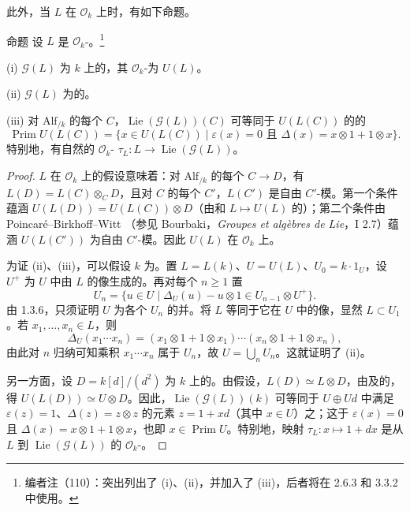 此外，当 $L$ 在 $\mathscr O_k$ 上时，有如下命题。
\begin{SGAresult}{命题}{}
设 $L$ 是 $\mathscr O_k$-。\footnote{编者注（110）：突出列出了 (i)、(ii)，并加入了 (iii)，后者将在 2.6.3 和 3.3.2 中使用。}

(i) $\mathscr G(L)$ 为 $k$ 上的，其 $\mathscr O_k$-为 $U(L)$。

(ii) $\mathscr G(L)$ 为的。

(iii) 对 $\mathrm{Alf}_{/k}$ 的每个 $C$，$\operatorname{Lie}(\mathscr G(L))(C)$ 可等同于 $U(L(C))$ 的的
\[
\operatorname{Prim}U(L(C))=\{x\in U(L(C))\mid\varepsilon(x)=0\text{ 且 }\Delta(x)=x\otimes1+1\otimes x\}.
\]
特别地，有自然的 $\mathscr O_k$- $\tau_L:L\to\operatorname{Lie}(\mathscr G(L))$。
\end{SGAresult}
\begin{proof}
$L$ 在 $\mathscr O_k$ 上的假设意味着：对 $\mathrm{Alf}_{/k}$ 的每个 $C\to D$，有 $L(D)=L(C)\otimes_C D$，且对 $C$ 的每个 $C'$，$L(C')$ 是自由 $C'$-模。第一个条件蕴涵 $U(L(D))=U(L(C))\otimes D$（由和 $L\mapsto U(L)$ 的）；第二个条件由 Poincaré--Birkhoff--Witt （参见 Bourbaki，\textit{Groupes et algèbres de Lie}，I 2.7）蕴涵 $U(L(C'))$ 为自由 $C'$-模。因此 $U(L)$ 在 $\mathscr O_k$ 上。

为证 (ii)、(iii)，可以假设 $k$ 为。置 $L=L(k)$、$U=U(L)$、$U_0=k\cdot1_U$，设 $U^+$ 为 $U$ 中由 $L$ 的像生成的。再对每个 $n\geq1$ 置
\[
U_n=\{u\in U\mid\Delta_U(u)-u\otimes1\in U_{n-1}\otimes U^+\}.
\]
由 1.3.6，只须证明 $U$ 为各个 $U_n$ 的并。将 $L$ 等同于它在 $U$ 中的像，显然 $L\subset U_1$。若 $x_1,\ldots,x_n\in L$，则
\[
\Delta_U(x_1\cdots x_n)=(x_1\otimes1+1\otimes x_1)\cdots(x_n\otimes1+1\otimes x_n),
\]
由此对 $n$ 归纳可知乘积 $x_1\cdots x_n$ 属于 $U_n$，故 $U=\bigcup_nU_n$。这就证明了 (ii)。

另一方面，设 $D=k[d]/(d^2)$ 为 $k$ 上的。由假设，$L(D)\simeq L\otimes D$，由及的，得 $U(L(D))\simeq U\otimes D$。因此，$\operatorname{Lie}(\mathscr G(L))(k)$ 可等同于 $U\oplus Ud$ 中满足 $\varepsilon(z)=1$、$\Delta(z)=z\otimes z$ 的元素 $z=1+xd$（其中 $x\in U$）之；这于 $\varepsilon(x)=0$ 且 $\Delta(x)=x\otimes1+1\otimes x$，也即 $x\in\operatorname{Prim}U$。特别地，映射 $\tau_L:x\mapsto1+dx$ 是从 $L$ 到 $\operatorname{Lie}(\mathscr G(L))$ 的 $\mathscr O_k$-。
\end{proof}

